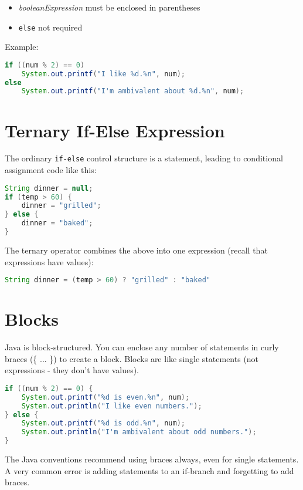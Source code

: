 \documentclass{article}
\begin{document}
\begin{itemize}
\item {\it booleanExpression} must be enclosed in parentheses
\item {\tt else} not required
\end{itemize}

Example:
\begin{lstlisting}[language=Java]
if ((num % 2) == 0)
    System.out.printf("I like %d.%n", num);
else
    System.out.printf("I'm ambivalent about %d.%n", num);
\end{lstlisting}


\section{Ternary If-Else Expression}


The ordinary {\tt if-else} control structure is a statement, leading
to conditional assignment code like this:
\begin{lstlisting}[language=Java]
String dinner = null;
if (temp > 60) {
    dinner = "grilled";
} else {
    dinner = "baked";
}
\end{lstlisting}

The ternary operator combines the above into one expression (recall
that expressions have values):

\begin{lstlisting}[language=Java]
String dinner = (temp > 60) ? "grilled" : "baked"
\end{lstlisting}



\section{Blocks}


Java is block-structured.  You can enclose any number
of statements in curly braces (\{ ... \}) to create a block.  Blocks
are like single statements (not expressions - they don't have values).
\begin{lstlisting}[language=Java]
if ((num % 2) == 0) {
    System.out.printf("%d is even.%n", num);
    System.out.println("I like even numbers.");
} else {
    System.out.printf("%d is odd.%n", num);
    System.out.println("I'm ambivalent about odd numbers.");
}
\end{lstlisting}
The Java conventions recommend using braces always, even for single
statements.  A very common error is adding statements to an if-branch
and forgetting to add braces.
\end{document}
